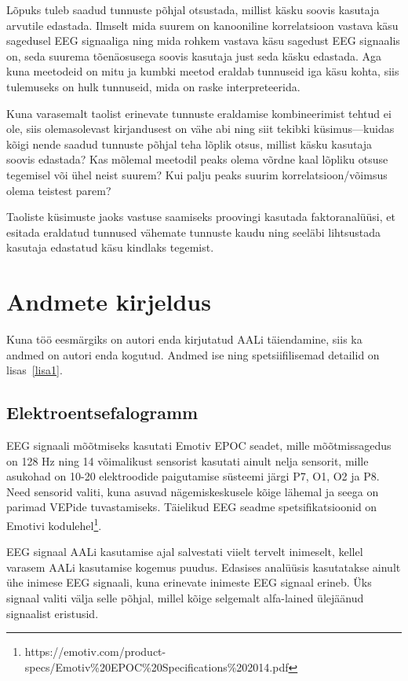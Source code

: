 \documentclass[a4paper,12pt]{report}
\begin{document}
Lõpuks tuleb saadud tunnuste põhjal otsustada, millist käsku soovis kasutaja arvutile edastada. Ilmselt mida suurem on kanooniline korrelatsioon vastava käsu sagedusel EEG signaaliga ning mida rohkem vastava käsu sagedust EEG signaalis on, seda suurema tõenäosusega soovis kasutaja just seda käsku edastada. Aga kuna meetodeid on mitu ja kumbki meetod eraldab tunnuseid iga käsu kohta, siis tulemuseks on hulk tunnuseid, mida on raske interpreteerida.

Kuna varasemalt taolist erinevate tunnuste eraldamise kombineerimist tehtud ei ole, siis olemasolevast kirjandusest on vähe abi ning siit tekibki küsimus---kuidas kõigi nende saadud tunnuste põhjal teha lõplik otsus, millist käsku kasutaja soovis edastada? Kas mõlemal meetodil peaks olema võrdne kaal lõpliku otsuse tegemisel või ühel neist suurem? Kui palju peaks suurim korrelatsioon/võimsus olema teistest parem?

Taoliste küsimuste jaoks vastuse saamiseks proovingi kasutada faktoranalüüsi, et esitada eraldatud tunnused vähemate tunnuste kaudu ning seeläbi lihtsustada kasutaja edastatud käsu kindlaks tegemist.

\chapter{Andmete kirjeldus}

Kuna töö eesmärgiks on autori enda kirjutatud AALi täiendamine, siis ka andmed on autori enda kogutud. Andmed ise ning spetsiifilisemad detailid on lisas~\ref{lisa1}.

\section{Elektroentsefalogramm}

EEG signaali mõõtmiseks kasutati Emotiv EPOC seadet, mille mõõtmissagedus on 128 Hz ning 14 võimalikust sensorist kasutati ainult nelja sensorit, mille asukohad on 10-20 elektroodide paigutamise süsteemi järgi P7, O1, O2 ja P8. Need sensorid valiti, kuna asuvad nägemiskeskusele kõige lähemal ja seega on parimad VEPide tuvastamiseks. Täielikud EEG seadme spetsifikatsioonid on Emotivi kodulehel\footnote{https://emotiv.com/product-specs/Emotiv\%20EPOC\%20Specifications\%202014.pdf}.

EEG signaal AALi kasutamise ajal salvestati viielt tervelt inimeselt, kellel varasem AALi kasutamise kogemus puudus. Edasises analüüsis kasutatakse ainult ühe inimese EEG signaali, kuna erinevate inimeste EEG signaal erineb. Üks signaal valiti välja selle põhjal, millel kõige selgemalt alfa-lained ülejäänud signaalist eristusid.
\end{document}
